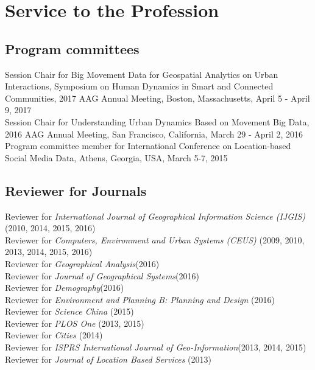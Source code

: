 \documentclass[11pt, a4paper]{article}
\begin{document}

\section*{Service to the Profession}
\subsection*{Program committees}
Session Chair for Big Movement Data for Geospatial Analytics on Urban Interactions, Symposium on Human Dynamics in Smart and Connected Communities, 2017 AAG Annual Meeting, Boston, Massachusetts, April 5 - April 9, 2017\\
Session Chair for Understanding Urban Dynamics Based on Movement Big Data, 2016 AAG Annual Meeting, San Francisco, California, March 29 - April 2, 2016\\
Program committee member for International Conference on Location-based Social Media Data, Athens, Georgia, USA, March 5-7, 2015

\subsection*{Reviewer for Journals}
Reviewer for \emph{International Journal of Geographical Information Science (IJGIS)} (2010, 2014, 2015, 2016)\\
Reviewer for \emph{Computers, Environment and Urban Systems (CEUS)} (2009, 2010, 2013,  2014, 2015, 2016)\\
Reviewer for \emph{Geographical Analysis}(2016)\\
Reviewer for \emph{Journal of Geographical Systems}(2016)\\
Reviewer for \emph{Demography}(2016)\\
Reviewer for \emph{Environment and Planning B: Planning and Design} (2016)\\
Reviewer for \emph{Science China} (2015)\\
Reviewer for \emph{PLOS One} (2013, 2015)\\
Reviewer for \emph{Cities} (2014)\\
Reviewer for \emph{ISPRS International Journal of Geo-Information}(2013, 2014, 2015)\\
Reviewer for \emph{Journal of Location Based Services} (2013)
\end{document}
